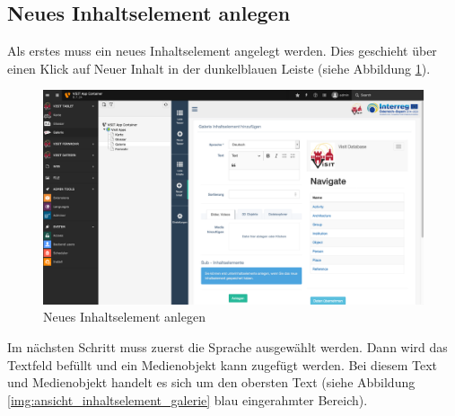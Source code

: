 \subsection{Neues Inhaltselement anlegen}

Als erstes muss ein neues Inhaltselement angelegt werden. Dies geschieht über einen Klick auf \glqq Neuer Inhalt\grqq{} in der dunkelblauen Leiste (siehe Abbildung \ref{img:neues_inhaltselement_anlegen}).

\begin{figure}[ht!]
\centering
\includegraphics[width=12cm]{Figures/paula/galerie/neues_inhaltselement_anlegen.png}
\caption{Neues Inhaltselement anlegen}
\label{img:neues_inhaltselement_anlegen}
\end{figure}

Im nächsten Schritt muss zuerst die Sprache ausgewählt werden. Dann wird das Textfeld befüllt und ein Medienobjekt kann zugefügt werden. Bei diesem Text und Medienobjekt handelt es sich um den obersten Text (siehe Abbildung \ref{img:ansicht_inhaltselement_galerie} blau eingerahmter Bereich).

